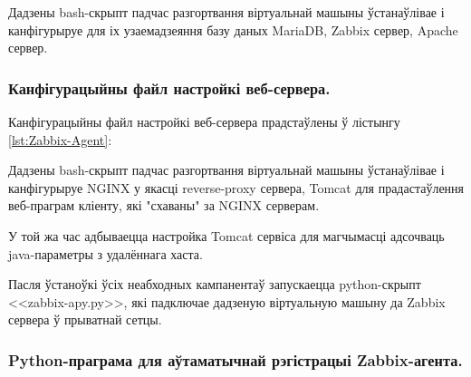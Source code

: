 Дадзены bash-скрыпт падчас разгортвання віртуальнай машыны
ўстанаўлівае і канфігурыруе для іх узаемадзеяння
базу даных MariaDB, Zabbix сервер, Apache сервер.

\subsubsection{Канфігурацыйны файл настройкі веб-сервера.}
Канфігурацыйны файл настройкі веб-сервера прадстаўлены ў лістынгу
\ref{lst:Zabbix-Agent}:



Дадзены bash-скрыпт падчас разгортвання віртуальнай машыны
ўстанаўлівае і канфігурыруе NGINX у якасці reverse-proxy сервера,
Tomcat для прадастаўлення веб-праграм кліенту, які "схаваны" за NGINX серверам.

У той жа час адбываецца настройка Tomcat сервіса для магчымасці адсочваць
java-параметры з удалённага хаста.

Пасля ўстаноўкі ўсіх неабходных кампанентаў запускаецца python-скрыпт
<<zabbix-apy.py>>, які падключае дадзеную віртуальную машыну да
Zabbix сервера ў прыватнай сетцы.

\subsubsection{Python-праграма для аўтаматычнай рэгістрацыі Zabbix-агента.}

